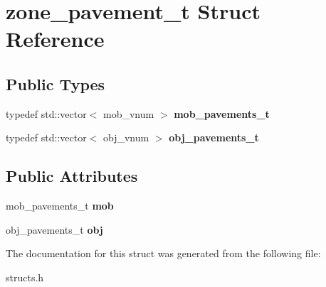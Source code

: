 \hypertarget{structzone__pavement__t}{}\section{zone\+\_\+pavement\+\_\+t Struct Reference}
\label{structzone__pavement__t}
\subsection*{Public Types}
\begin{DoxyCompactItemize}
\item 
\mbox{\label{structzone__pavement__t_a276d87c9fc706c8fe123866729f233f9}} 
typedef std\+::vector$<$ mob\+\_\+vnum $>$ {\bfseries mob\+\_\+pavements\+\_\+t}
\item 
\mbox{\label{structzone__pavement__t_a4a13914c314d1aac8b4d961edb6cefd3}} 
typedef std\+::vector$<$ obj\+\_\+vnum $>$ {\bfseries obj\+\_\+pavements\+\_\+t}
\end{DoxyCompactItemize}
\subsection*{Public Attributes}
\begin{DoxyCompactItemize}
\item 
\mbox{\label{structzone__pavement__t_a30a091f07a7f21f9bc7d5cf782199a9a}} 
mob\+\_\+pavements\+\_\+t {\bfseries mob}
\item 
\mbox{\label{structzone__pavement__t_a64ca5396572d4b01aa61755e8b4d4c36}} 
obj\+\_\+pavements\+\_\+t {\bfseries obj}
\end{DoxyCompactItemize}


The documentation for this struct was generated from the following file\+:\begin{DoxyCompactItemize}
\item 
structs.\+h\end{DoxyCompactItemize}
